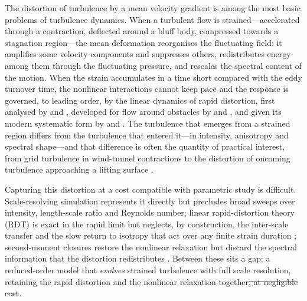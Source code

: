 \documentclass[lineno]{JFM-FLM_Au}
\providecommand{\DIFdel}[1]{{\protect\color{red}\sout{#1}}} %
\providecommand{\DIFdelbegin}{} %
\providecommand{\DIFdelend}{} %
\begin{document}
The distortion of turbulence by a mean velocity gradient is among the
most basic problems of turbulence dynamics. When a turbulent flow is
strained---accelerated through a contraction, deflected around a bluff
body, compressed towards a stagnation region---the mean deformation
reorganises the fluctuating field: it amplifies some velocity components
and suppresses others, redistributes energy among them through the
fluctuating pressure, and rescales the spectral content of the motion.
When the strain accumulates in a time short compared with the eddy
turnover time, the nonlinear interactions cannot keep pace and the
response is governed, to leading order, by the linear dynamics of rapid
distortion, first analysed by \citet{BatchelorProudman1954} and
\citet{TownsendBook1976}, developed for flow around obstacles by
\citet{Hunt1973} and \citet{HuntGraham1978}, and given its modern
systematic form by \citet{HuntCarruthers1990} and
\citet{SagautCambon2018}. The turbulence that emerges from a strained
region differs from the turbulence that entered it---in intensity,
anisotropy and spectral shape---and that difference is often the
quantity of practical interest, from grid turbulence in wind-tunnel
contractions \citep{MillsCorrsin1959,TuckerReynolds1968,LeeReynolds1985}
to the distortion of oncoming turbulence approaching a lifting surface
\citep{HuntGraham1978,GoldsteinAtassi1976}.

Capturing this distortion at a cost compatible with parametric study is
difficult. Scale-resolving simulation represents it directly but
precludes broad sweeps over intensity, length-scale ratio and Reynolds
number; linear rapid-distortion theory (RDT) is exact in the rapid limit
but neglects, by construction, the inter-scale transfer and the slow
return to isotropy that act over any finite strain duration
\citep{SagautCambon2018}; second-moment closures restore the nonlinear
relaxation but discard the spectral information that the distortion
redistributes \citep{LaunderReeceRodi1975,Pope2000}. Between these sits
a gap: a reduced-order model that \emph{evolves} strained turbulence
with full scale resolution, retaining the rapid distortion and the
nonlinear relaxation together\DIFdelbegin \DIFdel{, at negligible cost}\DIFdelend .
\end{document}
